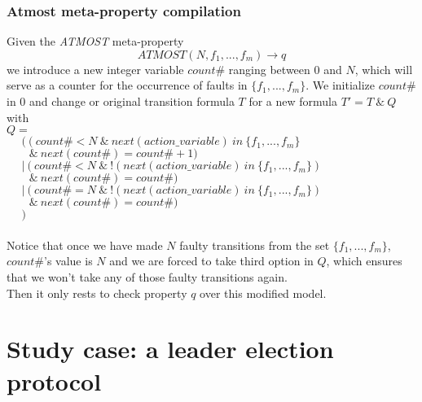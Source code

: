 \documentclass[12pt]{article}
\begin{document}
\subsubsection*{Atmost meta-property compilation}
Given the \textit{ATMOST} meta-property $$ATMOST(N,f_1,...,f_m) \rightarrow q$$ we introduce a new integer variable $count\#$ ranging between $0$ and $N$, which will serve as a counter for the occurrence of faults in $\{f_1,...,f_m\}$. We initialize $count\#$ in $0$ and change or original transition formula $T$ for a new formula $T' = T~\&~Q$ with\\
$Q = $\\ 
$~~~~~~(~(~count\# < N~\&~next(action\_variable)~in~\{f_1,...,f_m\}$\\
$~~~~~~~~~\&~next(count\#)=count\#+1)$\\
$~~~~~~|~(~count\# < N~\&~!(next(action\_variable)~in~\{f_1,...,f_m\})$\\
$~~~~~~~~~\&~next(count\#)=count\#)$\\
$~~~~~~|~(~count\# = N~\&~!(next(action\_variable)~in~\{f_1,...,f_m\})$\\
$~~~~~~~~~\&~next(count\#)=count\#)$\\
$~~~~~~)$\\\\
Notice that once we have made $N$ faulty transitions from the set $\{f_1,...,f_m\}$, $count\#$'s value is $N$ and we are forced to take third option in $Q$, which ensures that we won't take any of those faulty transitions again.\\
Then it only rests to check property $q$ over this modified model.

\section{Study case: a leader election protocol}
\end{document}
